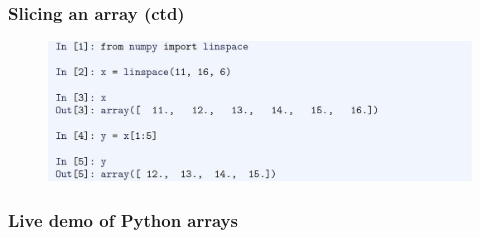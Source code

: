 \documentclass[14pt]{beamer}
\begin{document}

\begin{frame}[fragile]

\frametitle{Slicing an array (ctd)}

\begin{figure}[ht]
	\centering
	\includegraphics[width=\textwidth]{figures/LLp51}
\end{figure}

\end{frame}


\begin{frame}[fragile]
\frametitle{Live demo of Python arrays}

\end{frame}

%
%
%
%
%
%
%
%
%
%
%
\end{document}
